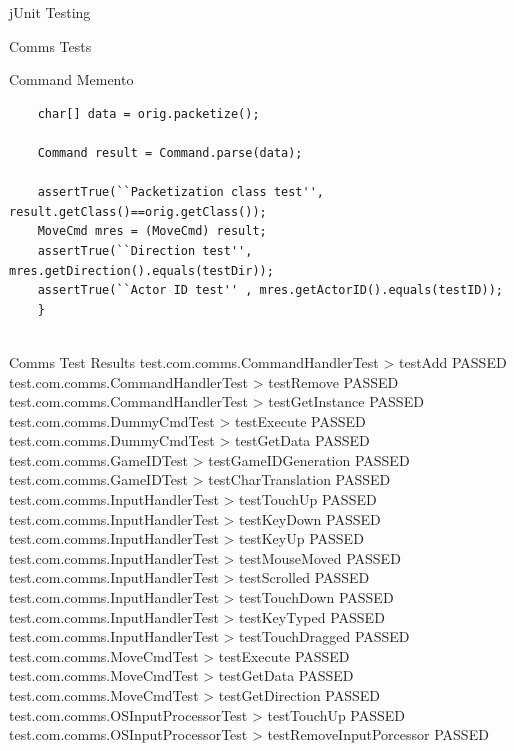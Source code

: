 \documentclass[12pt]{report}
\begin{document}
\begin{chapter}{jUnit Testing}
\begin{section}{Comms Tests}
\begin{subsection}{Command Memento}
\begin{lstlisting}
    char[] data = orig.packetize();

    Command result = Command.parse(data);

    assertTrue(``Packetization class test'', result.getClass()==orig.getClass());
    MoveCmd mres = (MoveCmd) result;
    assertTrue(``Direction test'', mres.getDirection().equals(testDir));
    assertTrue(``Actor ID test'' , mres.getActorID().equals(testID));
    }


    \end{lstlisting}
   \end{subsection}
  \end{section}
  \begin{section}{Comms Test Results}
  	test.com.comms.CommandHandlerTest > testAdd PASSED\\
	test.com.comms.CommandHandlerTest > testRemove PASSED\\
	test.com.comms.CommandHandlerTest > testGetInstance PASSED\\
  	test.com.comms.DummyCmdTest > testExecute PASSED\\
  	test.com.comms.DummyCmdTest > testGetData PASSED\\
  	test.com.comms.GameIDTest > testGameIDGeneration PASSED\\
  	test.com.comms.GameIDTest > testCharTranslation PASSED\\
  	test.com.comms.InputHandlerTest > testTouchUp PASSED\\
  	test.com.comms.InputHandlerTest > testKeyDown PASSED\\
  	test.com.comms.InputHandlerTest > testKeyUp PASSED\\
  	test.com.comms.InputHandlerTest > testMouseMoved PASSED\\
  	test.com.comms.InputHandlerTest > testScrolled PASSED\\
  	test.com.comms.InputHandlerTest > testTouchDown PASSED\\
  	test.com.comms.InputHandlerTest > testKeyTyped PASSED\\
  	test.com.comms.InputHandlerTest > testTouchDragged PASSED\\
  	test.com.comms.MoveCmdTest > testExecute PASSED\\
  	test.com.comms.MoveCmdTest > testGetData PASSED\\
  	test.com.comms.MoveCmdTest > testGetDirection PASSED\\
  	test.com.comms.OSInputProcessorTest > testTouchUp PASSED\\
  	test.com.comms.OSInputProcessorTest > testRemoveInputPorcessor PASSED\\

\end{section}
\end{chapter}
\end{document}
